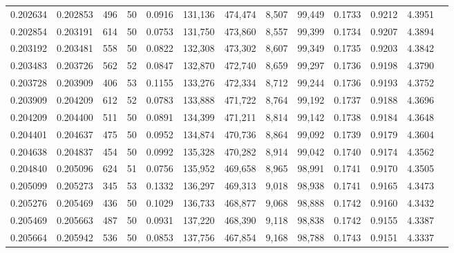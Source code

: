 \begin{tabular}{rrrrrrrrrrrrr}
0.202634 & 0.202853 &   496 &  50 &                                     0.0916 & 131,136 & 474,474 &   8,507 &  99,449 & 0.1733 & 0.9212 & 4.3951 \\
0.202854 & 0.203191 &   614 &  50 &                                     0.0753 & 131,750 & 473,860 &   8,557 &  99,399 & 0.1734 & 0.9207 & 4.3894 \\
0.203192 & 0.203481 &   558 &  50 &                                     0.0822 & 132,308 & 473,302 &   8,607 &  99,349 & 0.1735 & 0.9203 & 4.3842 \\
0.203483 & 0.203726 &   562 &  52 &                                     0.0847 & 132,870 & 472,740 &   8,659 &  99,297 & 0.1736 & 0.9198 & 4.3790 \\
0.203728 & 0.203909 &   406 &  53 &                                     0.1155 & 133,276 & 472,334 &   8,712 &  99,244 & 0.1736 & 0.9193 & 4.3752 \\
0.203909 & 0.204209 &   612 &  52 &                                     0.0783 & 133,888 & 471,722 &   8,764 &  99,192 & 0.1737 & 0.9188 & 4.3696 \\
0.204209 & 0.204400 &   511 &  50 &                                     0.0891 & 134,399 & 471,211 &   8,814 &  99,142 & 0.1738 & 0.9184 & 4.3648 \\
0.204401 & 0.204637 &   475 &  50 &                                     0.0952 & 134,874 & 470,736 &   8,864 &  99,092 & 0.1739 & 0.9179 & 4.3604 \\
0.204638 & 0.204837 &   454 &  50 &                                     0.0992 & 135,328 & 470,282 &   8,914 &  99,042 & 0.1740 & 0.9174 & 4.3562 \\
0.204840 & 0.205096 &   624 &  51 &                                     0.0756 & 135,952 & 469,658 &   8,965 &  98,991 & 0.1741 & 0.9170 & 4.3505 \\
0.205099 & 0.205273 &   345 &  53 &                                     0.1332 & 136,297 & 469,313 &   9,018 &  98,938 & 0.1741 & 0.9165 & 4.3473 \\
0.205276 & 0.205469 &   436 &  50 &                                     0.1029 & 136,733 & 468,877 &   9,068 &  98,888 & 0.1742 & 0.9160 & 4.3432 \\
0.205469 & 0.205663 &   487 &  50 &                                     0.0931 & 137,220 & 468,390 &   9,118 &  98,838 & 0.1742 & 0.9155 & 4.3387 \\
0.205664 & 0.205942 &   536 &  50 &                                     0.0853 & 137,756 & 467,854 &   9,168 &  98,788 & 0.1743 & 0.9151 & 4.3337 \\

\end{tabular}
